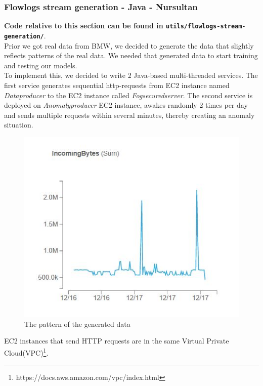         \subsubsection{Flowlogs stream generation - Java - Nursultan}
        \textbf{Code relative to this section can be found in \lstinline{utils/flowlogs-stream-generation/}}. \\
        Prior we got real data from BMW, we decided to generate the data that slightly reflects patterns of the real data. We needed that generated data to start training and testing our models. \\To implement this, we decided to write 2 Java-based multi-threaded services. The first service generates sequential http-requests from EC2 instance named \textit{Data\textunderscore producer} to the EC2 instance called \textit{Fog\textunderscore secured\textunderscore server}. The second service is deployed on \textit{Anomaly\textunderscore producer} EC2 instance, awakes randomly 2 times per day and sends multiple requests within several minutes, thereby creating an anomaly situation.
            \begin{figure}[h]
            \centering
            \includegraphics{images/data-generation.jpg}
            \caption{The pattern of the generated data}
            \label{fig:data-generation}
        \end{figure}
        \FloatBarrier
        EC2 instances that send HTTP requests are in the same Virtual Private Cloud(VPC)\footnote{ https://docs.aws.amazon.com/vpc/index.html}. 
